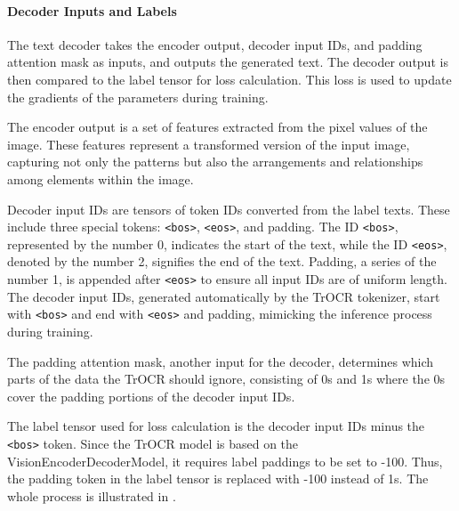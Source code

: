 \paragraph*{Decoder Inputs and Labels}
\label{par:3_decoder_inputs_and_labels}
The text decoder takes the encoder output, decoder input IDs, and padding attention mask as inputs, and outputs the generated text. The decoder output is then compared to the label tensor for loss calculation. This loss is used to update the gradients of the parameters during training.

The encoder output is a set of features extracted from the pixel values of the image. These features represent a transformed version of the input image, capturing not only the patterns but also the arrangements and relationships among elements within the image.

Decoder input IDs are tensors of token IDs converted from the label texts. These include three special tokens: \texttt{<bos>}, \texttt{<eos>}, and padding. The ID \texttt{<bos>}, represented by the number 0, indicates the start of the text, while the ID \texttt{<eos>}, denoted by the number 2, signifies the end of the text. Padding, a series of the number 1, is appended after \texttt{<eos>} to ensure all input IDs are of uniform length. The decoder input IDs, generated automatically by the TrOCR tokenizer, start with \texttt{<bos>} and end with \texttt{<eos>} and padding, mimicking the inference process during training. 

The padding attention mask, another input for the decoder, determines which parts of the data the TrOCR should ignore, consisting of 0s and 1s where the 0s cover the padding portions of the decoder input IDs.

The label tensor used for loss calculation is the decoder input IDs minus the \texttt{<bos>} token. Since the TrOCR model is based on the VisionEncoderDecoderModel, it requires label paddings to be set to -100. Thus, the padding token in the label tensor is replaced with -100 instead of 1s. The whole process is illustrated in .

